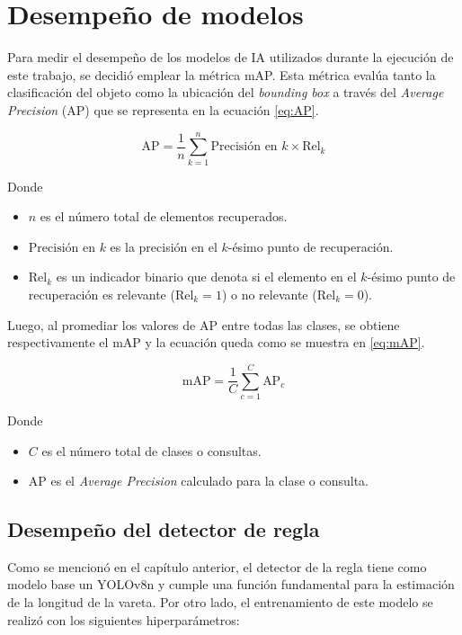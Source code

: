\section{Desempeño de modelos}
\label{sec:desempeñoMod}

Para medir el desempeño de los modelos de IA utilizados durante la ejecución de este trabajo, se decidió emplear la métrica mAP. Esta métrica evalúa tanto la clasificación del objeto como la ubicación del \textit{bounding box} a través del \textit{Average Precision} (AP) que se representa en la ecuación \ref{eq:AP}.

\begin{equation}
    \label{eq:AP}
    \text{AP} = \frac{1}{n} \sum_{k=1}^n \text{Precisión en } k \times \text{Rel}_{k}
\end{equation}

Donde
\begin{itemize}
    \item \( n \) es el número total de elementos recuperados.
    \item \(\text{Precisión en } k\) es la precisión en el \( k \)-ésimo punto de recuperación.
    \item \(\text{Rel}_{k}\) es un indicador binario que denota si el elemento en el \( k \)-ésimo punto de recuperación es relevante (\( \text{Rel}_{k} = 1 \)) o no relevante (\( \text{Rel}_{k} = 0 \)).
\end{itemize}

Luego, al promediar los valores de AP entre todas las clases, se obtiene respectivamente el mAP y la ecuación queda como se muestra en \ref{eq:mAP}.

\begin{equation}
    \label{eq:mAP}
    \text{mAP} = \frac{1}{C} \sum_{c=1}^C \text{AP}_c
\end{equation}

Donde 
\begin{itemize}
	\item \( C \) es el número total de clases o consultas.
    \item AP es el \textit{Average Precision} calculado para la clase o consulta.
\end{itemize}

\subsection{Desempeño del detector de regla}

Como se mencionó en el capítulo anterior, el detector de la regla tiene como modelo base un YOLOv8n y cumple una función fundamental para la estimación de la longitud de la vareta. Por otro lado, el entrenamiento de este modelo se realizó con los siguientes hiperparámetros:

